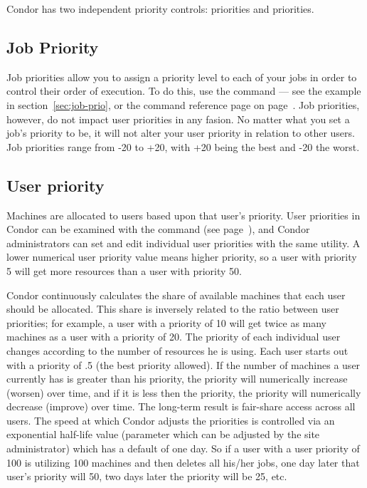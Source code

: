 Condor has two independent priority controls: 
priorities and  priorities.  

\subsection{Job Priority}

Job priorities allow you to assign a priority level to each of your jobs in order to
control their order of execution.  To do this, use the 
command --- see the example in section~\ref{sec:job-prio}, or the
command reference page on page~\pageref{man-condor-prio}.  Job
priorities, however, do not impact user priorities in any fasion.  No matter what you
set a job's priority to be, it will not alter your user priority in
relation to other users.  Job priorities range from -20 to +20, with +20
being the best and -20 the worst.  

\subsection{\label{sec:user-priority-explained}User priority}

Machines are allocated to users based upon that user's priority. User
priorities in Condor can be examined with the 
command (see page~\pageref{man-condor-userprio}),
and Condor administrators can set and edit individual user priorities
with the same utility. A lower numerical user priority value means
higher priority, so a user with priority 5 will get more resources than
a user with priority 50.  

Condor continuously calculates the share of available machines that each
user should be allocated.    This share is inversely related to the ratio
between user priorities; for example, a user with a priority of 10 will
get twice as many machines as a user with a priority of 20. The priority
of each individual user changes according to the number of resources he
is using. Each user starts out with a priority of .5 (the best
priority allowed).  If the number of machines a user currently has is greater than his
priority, the priority will numerically increase (worsen) over time, and if it is less then
the priority, the priority will numerically decrease (improve) over time. 
The long-term result is fair-share access across all users.  The speed
at which Condor adjusts the priorities is controlled via an exponential
half-life value (parameter  which can be adjusted
by the site administrator) which has a
default of one day.  So if a user with a user priority of 100 is
utilizing 100 machines and then deletes all his/her jobs, one day later that user's
priority will  50, two days later the priority will be 25, etc. 

